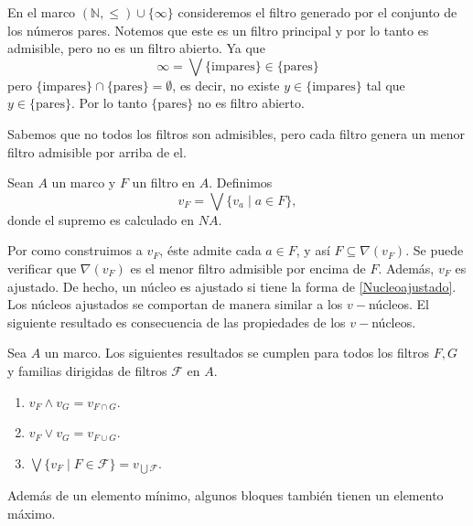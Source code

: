 \begin{ej}
    En el marco $(\mathbb{N}, \leq)\cup \{\infty\}$ consideremos el filtro generado por el conjunto de los números pares. Notemos que este es un filtro principal y por lo tanto es admisible, pero no es un filtro abierto. Ya que 
    \[
    \infty=\bigvee \{\mbox{impares}\}\in\{\mbox{pares}\}
    \]
    pero $\{\mbox{impares}\}\cap \{\mbox{pares}\}=\emptyset$, es decir, no existe $y\in \{\mbox{impares}\}$ tal que $y\in \{\mbox{pares}\}$. Por lo tanto $\{\mbox{pares}\}$ no es filtro abierto.
\end{ej}

Sabemos que no todos los filtros son admisibles, pero cada filtro genera un menor filtro admisible por arriba de el.

\begin{dfn}\label{Definicion5.5.6}
    Sean $A$ un marco y $F$ un filtro en $A$. Definimos 
    \begin{equation}\label{Nucleoajustado}
    v_F=\bigvee\{v_a\mid a\in F\},
    \end{equation}
    donde el supremo es calculado en $NA$.
\end{dfn}

Por como construimos a $v_F$, éste admite cada $a\in F$, y así $F\subseteq \nabla(v_F)$. Se puede verificar que $\nabla(v_F)$ es el menor filtro admisible por encima de $F$. Además, $v_F$ es ajustado. De hecho, un núcleo es ajustado si tiene la forma de \ref{Nucleoajustado}.\\

Los núcleos ajustados se comportan de manera similar a los $v-$núcleos. El siguiente resultado es consecuencia de las propiedades de los $v-$núcleos.

\begin{lem}\label{Lema5.5.7}
    Sea $A$ un marco. Los siguientes resultados se cumplen para todos los filtros $F, G$ y familias dirigidas de filtros $\mathcal{F}$ en $A$.
    \begin{enumerate}[$i) $]
        \item $v_F\wedge v_G=v_{F\cap G}$.
        \item $v_F\vee v_G=v_{F\cup G}$.
        \item $\bigvee\{v_F\mid F\in \mathcal{F}\}=v_{\bigcup \mathcal{F}}$.
    \end{enumerate}
\end{lem}

Además de un elemento mínimo, algunos bloques también tienen un elemento máximo.


